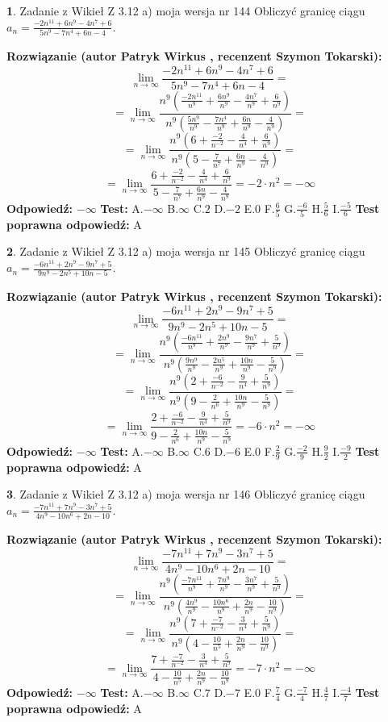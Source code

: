 \documentclass[12pt, a4paper]{article}
\theoremstyle{definition} %
\newtheorem{zad}{}
\newcommand{\zadStart}[1]{\begin{zad}#1\newline}
\newcommand{\zadStop}{\end{zad}}
\newcommand{\rozwStart}[2]{\noindent \textbf{Rozwiązanie (autor #1 , recenzent #2): }\newline}
\newcommand{\rozwStop}{\newline}
\newcommand{\odpStart}{\noindent \textbf{Odpowiedź:}\newline}
\newcommand{\odpStop}{\newline}
\newcommand{\testStart}{\noindent \textbf{Test:}\newline}
\newcommand{\testStop}{\newline}
\newcommand{\kluczStart}{\noindent \textbf{Test poprawna odpowiedź:}\newline}
\newcommand{\kluczStop}{\newline}
\begin{document}
\zadStart{Zadanie z Wikieł Z 3.12 a) moja wersja nr 144}
Obliczyć granicę ciągu $a_{n}=\frac{-2n^{11}+6n^{9}-4n^{7}+6}{5n^{9}-7n^{4}+6n-4}$.
\zadStop
\rozwStart{Patryk Wirkus}{Szymon Tokarski}
$$\lim\limits_{n\to\infty}\frac{-2n^{11}+6n^{9}-4n^{7}+6}{5n^{9}-7n^{4}+6n-4}=$$
$$=\lim\limits_{n\to\infty}\frac{n^{9}\left(\frac{-2n^{11}}{n^{9}}+\frac{6n^{9}}{n^{9}}-\frac{4n^{7}}{n^{9}}+\frac{6}{n^{9}}\right)}{n^{9}\left(\frac{5n^{9}}{n^{9}}-\frac{7n^{4}}{n^{9}}+\frac{6n}{n^{9}}-\frac{4}{n^{9}}\right)}=$$
$$=\lim\limits_{n\to\infty}\frac{n^{9}\left(6+\frac{-2}{n^{-2}}-\frac{4}{n^{4}}+\frac{6}{n^{9}}\right)}
{n^{9}\left(5-\frac{7}{n^{7}}+\frac{6n}{n^{9}}-\frac{4}{n^{9}}\right)}=$$
$$=\lim\limits_{n\to\infty}\frac{6+\frac{-2}{n^{-2}}-\frac{4}{n^{4}}+\frac{6}{n^{9}}}{5-\frac{7}{n^{7}}+\frac{6n}{n^{9}}-\frac{4}{n^{9}}}=-2\cdot n^{2} = -\infty$$
\rozwStop
\odpStart
$-\infty$
\odpStop
\testStart
A.$-\infty$
B.$\infty$
C.$2$
D.$-2$
E.$0$
F.$\frac{6}{5}$
G.$\frac{-6}{5}$
H.$\frac{5}{6}$
I.$\frac{-5}{6}$
\testStop
\kluczStart
A
\kluczStop



\zadStart{Zadanie z Wikieł Z 3.12 a) moja wersja nr 145}
Obliczyć granicę ciągu $a_{n}=\frac{-6n^{11}+2n^{9}-9n^{7}+5}{9n^{9}-2n^{5}+10n-5}$.
\zadStop
\rozwStart{Patryk Wirkus}{Szymon Tokarski}
$$\lim\limits_{n\to\infty}\frac{-6n^{11}+2n^{9}-9n^{7}+5}{9n^{9}-2n^{5}+10n-5}=$$
$$=\lim\limits_{n\to\infty}\frac{n^{9}\left(\frac{-6n^{11}}{n^{9}}+\frac{2n^{9}}{n^{9}}-\frac{9n^{7}}{n^{9}}+\frac{5}{n^{9}}\right)}{n^{9}\left(\frac{9n^{9}}{n^{9}}-\frac{2n^{5}}{n^{9}}+\frac{10n}{n^{9}}-\frac{5}{n^{9}}\right)}=$$
$$=\lim\limits_{n\to\infty}\frac{n^{9}\left(2+\frac{-6}{n^{-2}}-\frac{9}{n^{4}}+\frac{5}{n^{9}}\right)}
{n^{9}\left(9-\frac{2}{n^{6}}+\frac{10n}{n^{9}}-\frac{5}{n^{9}}\right)}=$$
$$=\lim\limits_{n\to\infty}\frac{2+\frac{-6}{n^{-2}}-\frac{9}{n^{4}}+\frac{5}{n^{9}}}{9-\frac{2}{n^{6}}+\frac{10n}{n^{9}}-\frac{5}{n^{9}}}=-6\cdot n^{2} = -\infty$$
\rozwStop
\odpStart
$-\infty$
\odpStop
\testStart
A.$-\infty$
B.$\infty$
C.$6$
D.$-6$
E.$0$
F.$\frac{2}{9}$
G.$\frac{-2}{9}$
H.$\frac{9}{2}$
I.$\frac{-9}{2}$
\testStop
\kluczStart
A
\kluczStop



\zadStart{Zadanie z Wikieł Z 3.12 a) moja wersja nr 146}
Obliczyć granicę ciągu $a_{n}=\frac{-7n^{11}+7n^{9}-3n^{7}+5}{4n^{9}-10n^{6}+2n-10}$.
\zadStop
\rozwStart{Patryk Wirkus}{Szymon Tokarski}
$$\lim\limits_{n\to\infty}\frac{-7n^{11}+7n^{9}-3n^{7}+5}{4n^{9}-10n^{6}+2n-10}=$$
$$=\lim\limits_{n\to\infty}\frac{n^{9}\left(\frac{-7n^{11}}{n^{9}}+\frac{7n^{9}}{n^{9}}-\frac{3n^{7}}{n^{9}}+\frac{5}{n^{9}}\right)}{n^{9}\left(\frac{4n^{9}}{n^{9}}-\frac{10n^{6}}{n^{9}}+\frac{2n}{n^{9}}-\frac{10}{n^{9}}\right)}=$$
$$=\lim\limits_{n\to\infty}\frac{n^{9}\left(7+\frac{-7}{n^{-2}}-\frac{3}{n^{4}}+\frac{5}{n^{9}}\right)}
{n^{9}\left(4-\frac{10}{n^{5}}+\frac{2n}{n^{9}}-\frac{10}{n^{9}}\right)}=$$
$$=\lim\limits_{n\to\infty}\frac{7+\frac{-7}{n^{-2}}-\frac{3}{n^{4}}+\frac{5}{n^{9}}}{4-\frac{10}{n^{5}}+\frac{2n}{n^{9}}-\frac{10}{n^{9}}}=-7\cdot n^{2} = -\infty$$
\rozwStop
\odpStart
$-\infty$
\odpStop
\testStart
A.$-\infty$
B.$\infty$
C.$7$
D.$-7$
E.$0$
F.$\frac{7}{4}$
G.$\frac{-7}{4}$
H.$\frac{4}{7}$
I.$\frac{-4}{7}$
\testStop
\kluczStart
A
\kluczStop
\end{document}
